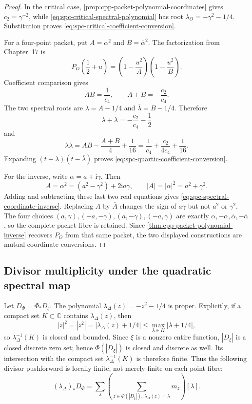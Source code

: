 \begin{proof}
In the critical case, \cref{prop:cpp-packet-polynomial-coordinates} gives
\(c_2=\gamma^{-2}\), while
\eqref{eq:spc-critical-spectral-polynomial} has root
\(\lambda_O=-\gamma^2-1/4\).  Substitution proves
\eqref{eq:spc-critical-coefficient-conversion}.

For a four-point packet, put \(A=\alpha^2\) and
\(B=\overline{\alpha}^{2}\).  The factorization from Chapter~17 is
\[
 P_O\left(\frac12+u\right)
 =\left(1-\frac{u^2}{A}\right)
  \left(1-\frac{u^2}{B}\right).
\]
Coefficient comparison gives
\begin{equation}
\label{eq:spc-AB-from-c}
 AB=\frac1{c_4},
 \qquad
 A+B=-\frac{c_2}{c_4}.
\end{equation}
The two spectral roots are \(\lambda=A-1/4\) and
\(\overline\lambda=B-1/4\).  Therefore
\[
 \lambda+\overline\lambda
 =-\frac{c_2}{c_4}-\frac12
\]
and
\[
 \lambda\overline\lambda
 =AB-\frac{A+B}{4}+\frac1{16}
 =\frac1{c_4}+\frac{c_2}{4c_4}+\frac1{16}.
\]
Expanding \((t-\lambda)(t-\overline\lambda)\) proves
\eqref{eq:spc-quartic-coefficient-conversion}.

For the inverse, write \(\alpha=a+\mathrm i\gamma\).  Then
\[
 A=\alpha^2=(a^2-\gamma^2)+2\mathrm ia\gamma,
 \qquad
 |A|=|\alpha|^2=a^2+\gamma^2.
\]
Adding and subtracting these last two real equations gives
\eqref{eq:spc-spectral-coordinate-inverse}.  Replacing \(A\) by
\(\overline A\) changes the sign of \(a\gamma\) but not \(a^2\) or
\(\gamma^2\).  The four choices
\((a,\gamma),(-a,-\gamma),(a,-\gamma),(-a,\gamma)\) are exactly
\(\alpha,-\alpha,\overline\alpha,-\overline\alpha\), so the complete packet
fibre is retained.  Since \cref{thm:cpp-packet-polynomial-inverse} recovers
\(P_O\) from that same packet, the two displayed constructions are mutual
coordinate conversions.
\end{proof}

\subsection{Divisor multiplicity under the quadratic spectral map}

Let \(D_\Phi=\Phi_*D_\xi\).  The polynomial
\(\lambda_\Delta(z)=-z^2-1/4\) is proper.  Explicitly, if a compact set
\(K\subset\mathbb C\) contains \(\lambda_\Delta(z)\), then
\[
 |z|^2=|z^2|=|\lambda_\Delta(z)+1/4|
 \leq \max_{\lambda\in K}|\lambda+1/4|,
\]
so \(\lambda_\Delta^{-1}(K)\) is closed and bounded.  Since \(\xi\) is a
nonzero entire function, \(|D_\xi|\) is a closed discrete zero set; hence
\(\Phi(|D_\xi|)\) is closed and discrete as well.  Its intersection with the
compact set \(\lambda_\Delta^{-1}(K)\) is therefore finite.  Thus the following
divisor pushforward is locally
finite, not merely finite on each point fibre:
\[
 (\lambda_\Delta)_*D_\Phi
 =
 \sum_\lambda
 \left(
   \sum_{z\in\Phi(|D_\xi|),\ \lambda_\Delta(z)=\lambda}m_z
 \right)[\lambda].
\]

